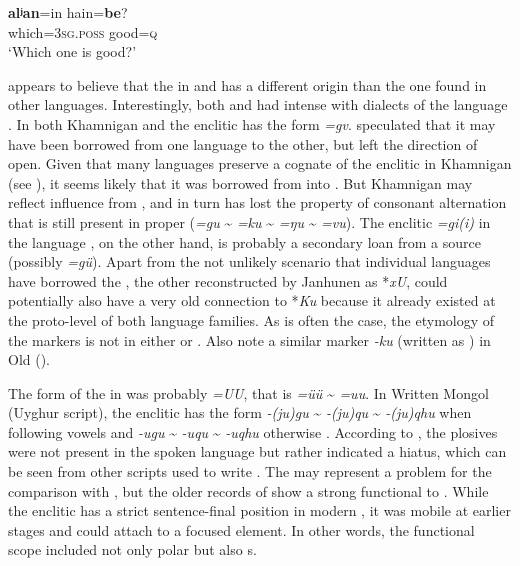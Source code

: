     \ex
    \gll \textbf{{al}}\textbf{{ʲ}}\textbf{{an}}=in    hain=\textbf{{be}}?\\
    which=3\textsc{sg}.\textsc{poss}  good=\textsc{q}\\
    \glt ‘Which one is good?’ \citep[5]{Yamakoshi2007b}
    \z
    \z

\citet{Janhunen2003a} appears to believe that the  in  and  has a different origin than the one found in other  languages. Interestingly, both  and  had intense  with dialects of the  language . In both Khamnigan  and  the enclitic has the form \textit{=gv}. \citet[95]{Janhunen1991} speculated that it may have been borrowed from one language to the other, but left the direction of  open. Given that many  languages preserve a cognate of the enclitic in Khamnigan  (see ), it seems likely that it was borrowed from  into . But Khamnigan  may reflect influence from , and in turn has lost the property of consonant alternation that is still present in  proper (\textit{=gu} {\textasciitilde} \textit{=ku} {\textasciitilde} \textit{=ŋu} {\textasciitilde} \textit{=vu}). The enclitic \textit{=gi(i)} in the  language , on the other hand, is probably a secondary loan from a  source (possibly  \textit{=gü}). Apart from the not unlikely scenario that individual  languages have borrowed the  , the other   reconstructed by Janhunen as *\textit{xU}, could potentially also have a very old connection to  *\textit{Ku} because it already existed at the proto-level of both language families. As is often the case, the etymology of the markers is not  in either  or . Also note a similar marker \textit{-ku} (written as ) in Old  ().

The form of the  in  was probably \textit{=UU}, that is \textit{=üü} {\textasciitilde} \textit{=uu}. In Written Mongol (Uyghur script), the enclitic has the form \textit{-(ju)gu} {\textasciitilde} \textit{-(ju)qu} {\textasciitilde} \textit{-(ju)qhu} when following vowels and \textit{-ugu} {\textasciitilde} \textit{-uqu} {\textasciitilde} \textit{-uqhu} otherwise \citep[79]{Rybatzki2003a}. According to \cite[45]{Street2008}, the plosives were not present in the spoken language but rather indicated a hiatus, which can be seen from other scripts used to write . The  may represent a problem for the comparison with , but the older records of  show a strong functional  to . While the enclitic has a strict sentence-final position in modern , it was mobile at earlier stages and could attach to a focused element. In other words, the functional scope included not only polar but also s.

